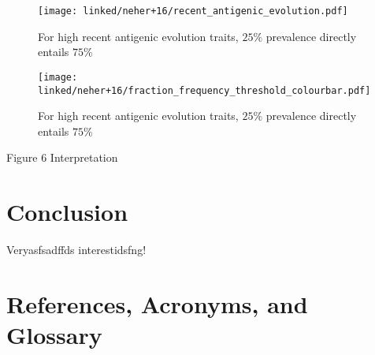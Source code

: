 \documentclass[12pt]{scrartcl}
\begin{document}
  \begin{figure}[h!]
    \texttt{[image: linked/neher+16/recent\_antigenic\_evolution.pdf]}
    \caption{\footnotesize For high recent antigenic evolution traits, $25\%$ prevalence directly entails $75\%$ \cite{neherBedford+16}}
  \end{figure}

  \begin{figure}[h!]
    \texttt{[image: linked/neher+16/fraction\_frequency\_threshold\_colourbar.pdf]}
    \caption{\footnotesize For high recent antigenic evolution traits, $25\%$ prevalence directly entails $75\%$ \cite{neherBedford+16}}
  \end{figure}

    Figure 6 Interpretation

\section{Conclusion}

  Veryasfsadffds interestidsfng!

\clearpage


\section{References, Acronyms, and Glossary}





\printglossary[type=\acronymtype]

\printglossary

% 

% 


\end{document}
